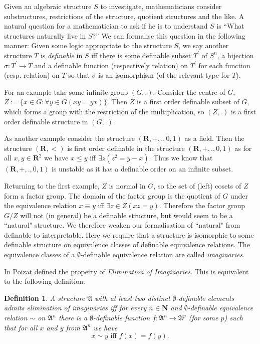 \documentclass[12pt]{article}
\newtheorem{df}{Definition}[section]
\newcommand{\ma}{\mathfrak{A}}
\newcommand{\bm}{\begin{displaymath}}
\newcommand{\ra}{\rightarrow}
\newcommand{\PR}{^{\prime}}
\begin{document}
Given an algebraic structure $S$ to investigate, mathematicians consider substructures, restrictions of the structure, quotient structures and the like. A natural question for a mathematician to ask if he is to understand $S$ is ``What structures naturally live in $S$?'' We can formalise this question in the following manner: Given some logic appropriate to the structure $S$, we say another structure $T$ is {\em definable} in $S$ iff there is some definable subset $T\PR$ of $S^{n}$, a bijection $\sigma: T\PR \ra T$ and a definable function (respectively relation) on $T\PR$ for each function (resp. relation) on $T$ so that $\sigma$ is an isomorphism (of the relevant type for $T$). 

For an example take some infinite group $(G,.)$. Consider the centre of $G$, $Z:=\{x \in G: \forall y \in G (xy=yx)\}$. Then $Z$ is a first order definable subset of $G$, which forms a group with the restriction of the multiplication, so $(Z,.)$ is a first order definable structure in $(G,.)$.

As another example consider the structure $(\mathbf{R},+,.,0,1)$ as a field. Then the structure $(\mathbf{R},<)$ is  first order definable in the structure $(\mathbf{R},+,.,0,1)$ as for all $x,y \in \mathbf{R}^{2}$ we have $x\leq y$ iff $\exists z (z^{2}=y-x)$. Thus we know that $(\mathbf{R},+,.,0,1)$ is unstable as it has a definable order on an infinite subset. 

Returning to the first example, $Z$ is normal in $G$, so the set of (left) cosets of $Z$ form a factor group. The domain of the factor group is the quotient of $G$ under the equivalence relation $x \equiv y$ iff $\exists z \in Z (xz=y)$. Therefore the factor group $G/Z$ will not (in general) be a definable structure, but would seem to be a ``natural" structure. We therefore weaken our formalisation of ``natural" from definable to interpretable. Here we require that a structure is isomorphic to some definable structure on equivalence classes of definable equivalence relations. The equivalence classes of a $\emptyset$-definable equivalence relation are called {\em imaginaries}. 

In  \cite{P2} Poizat defined the property of {\em Elimination of Imaginaries}. This is equivalent to the following definition: 

\begin{df} \label{I wanna b} A structure $\ma$ with at least two distinct $\emptyset$-definable elements admits {\em elimination of imaginaries} iff for every $n \in \mathbf{N}$ and $\emptyset$-definable equivalence relation $\sim$ on $\ma^{n}$ there is a $\emptyset$-definable function $f:\ma^{n} \ra \ma^{p}$ (for some $p$) such that for all $x$ and $y$ from $\ma^{n}$ we have
\bm x \sim y \textrm{ iff } f(x)=f(y). \end{displaymath} \end{df}
\end{document}
